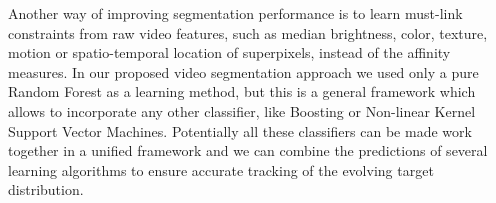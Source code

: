 Another way of improving segmentation performance is to learn must-link constraints from raw video features, such as median brightness, color, texture, motion or spatio-temporal location of superpixels, instead of 
the affinity measures.   
In our proposed video segmentation approach we used only a pure Random Forest as a learning method, but this is a general framework which allows to incorporate any other classifier, 
like Boosting or Non-linear Kernel Support Vector Machines. Potentially all these classifiers can be made work together in a unified framework and we can combine the predictions of several learning algorithms
to ensure accurate tracking of the evolving target distribution.

% 
